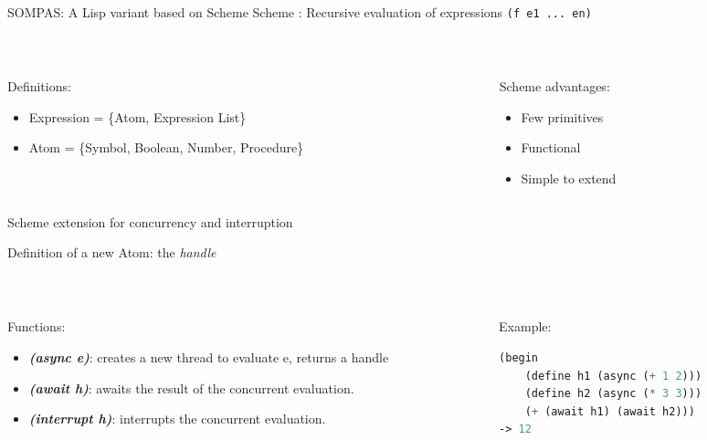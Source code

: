 
\begin{frame}[fragile]{SOMPAS: A Lisp variant based on Scheme}
    \centering
    Scheme : Recursive evaluation of expressions \verb|(f e1 ... en)|
    
    ~~

\pause
    \begin{columns}[t]
        \begin{column}{0.65\textwidth}
            Definitions:
            \begin{itemize}
                \item Expression = \{Atom, Expression List\}
                \item Atom = \{Symbol, Boolean, Number, Procedure\}
            \end{itemize}
\pause
        \end{column}
        \begin{column}{0.35\textwidth}
            Scheme advantages:
            \begin{itemize}
                \item Few primitives
                \item Functional
                \item Simple to extend
            \end{itemize}
        \end{column}
     \end{columns}

\end{frame}

\begin{frame}[fragile]{Scheme extension for concurrency and interruption}

    Definition of a new Atom: the \emph{handle}
    
    ~~
\pause
    \begin{columns}
        \begin{column}{0.6\textwidth}
            Functions:
            \begin{itemize}
                \item \textbf{\textit{(async e)}}: creates a new thread to evaluate e, returns a handle
                \item \textbf{\textit{(await h)}}: awaits the result of the concurrent evaluation.
                \item \textbf{\textit{(interrupt h)}}: interrupts the concurrent evaluation.
            \end{itemize}
        \end{column}
        \pause
        \begin{column}{0.4\textwidth}
        Example: 
\small
\lstset{columns=fullflexible}
            \begin{lstlisting}[language = lisp]
(begin
    (define h1 (async (+ 1 2)))
    (define h2 (async (* 3 3)))
    (+ (await h1) (await h2)))
-> 12 
            \end{lstlisting}
        \end{column}
    \end{columns}
\end{frame}


